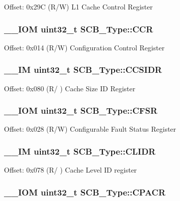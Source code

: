 Offset\-: 0x29\-C (R/\-W) L1 Cache Control Register \hypertarget{struct_s_c_b___type_a2d6653b0b70faac936046a02809b577f}{
\subsubsection[{C\-C\-R}]{\setlength{\rightskip}{0pt plus 5cm}\-\_\-\-\_\-\-I\-O\-M uint32\-\_\-t S\-C\-B\-\_\-\-Type\-::\-C\-C\-R}}\label{struct_s_c_b___type_a2d6653b0b70faac936046a02809b577f}
Offset\-: 0x014 (R/\-W) Configuration Control Register \hypertarget{struct_s_c_b___type_afd063c9297a1a3b67e6d1d5e179e6a0e}{
\subsubsection[{C\-C\-S\-I\-D\-R}]{\setlength{\rightskip}{0pt plus 5cm}\-\_\-\-\_\-\-I\-M uint32\-\_\-t S\-C\-B\-\_\-\-Type\-::\-C\-C\-S\-I\-D\-R}}\label{struct_s_c_b___type_afd063c9297a1a3b67e6d1d5e179e6a0e}
Offset\-: 0x080 (R/ ) Cache Size I\-D Register \hypertarget{struct_s_c_b___type_a0cda9e061b42373383418663092ad19a}{
\subsubsection[{C\-F\-S\-R}]{\setlength{\rightskip}{0pt plus 5cm}\-\_\-\-\_\-\-I\-O\-M uint32\-\_\-t S\-C\-B\-\_\-\-Type\-::\-C\-F\-S\-R}}\label{struct_s_c_b___type_a0cda9e061b42373383418663092ad19a}
Offset\-: 0x028 (R/\-W) Configurable Fault Status Register \hypertarget{struct_s_c_b___type_ad9899f5775251cf5ef0cb0845527afc2}{
\subsubsection[{C\-L\-I\-D\-R}]{\setlength{\rightskip}{0pt plus 5cm}\-\_\-\-\_\-\-I\-M uint32\-\_\-t S\-C\-B\-\_\-\-Type\-::\-C\-L\-I\-D\-R}}\label{struct_s_c_b___type_ad9899f5775251cf5ef0cb0845527afc2}
Offset\-: 0x078 (R/ ) Cache Level I\-D register \hypertarget{struct_s_c_b___type_ac6a860c1b8d8154a1f00d99d23b67764}{
\subsubsection[{C\-P\-A\-C\-R}]{\setlength{\rightskip}{0pt plus 5cm}\-\_\-\-\_\-\-I\-O\-M uint32\-\_\-t S\-C\-B\-\_\-\-Type\-::\-C\-P\-A\-C\-R}}\label{struct_s_c_b___type_ac6a860c1b8d8154a1f00d99d23b67764}
